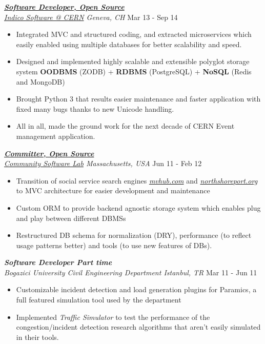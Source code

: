 \documentclass[line, margin]{res}
\begin{document}
\begin{resume}
{\sl \textbf{\href{http://indico-software.org/}{Software Developer, Open Source}} \\ \href{http://indico.cern.ch/}{Indico Software @ CERN} Geneva, CH} \hfill Mar 13 - Sep 14 \\
\vspace{-0.3cm}
\begin{itemize}
  \item Integrated MVC and structured coding, and extracted microservices which easily enabled using multiple databases for better scalability and speed.
  \item Designed and implemented highly scalable and extensible polyglot storage system \textbf{OODBMS} (ZODB) + \textbf{RDBMS} (PostgreSQL) + \textbf{NoSQL} (Redis and MongoDB)
  \item Brought Python 3 that results easier maintenance and faster application with fixed many bugs thanks to new Unicode handling.
  \item All in all, made the ground work for the next decade of CERN Event management application.
\end{itemize}

{\sl \textbf{\href{https://launchpad.net/mvhub}{Committer, Open Source}} \\ \href{http://thecsl.org/}{Community Software Lab} Massachusetts, USA} \hfill Jun 11 - Feb 12 \\
\vspace{-0.3cm}
\begin{itemize} \itemsep -2pt
  \item Transition of social service search engines \textit{\href{http://mvhub.com/}{mvhub.com}} and \textit{\href{http://northshoreport.org/}{northshoreport.org}} to MVC architecture for easier development and maintenance
  \item Custom ORM to provide backend agnostic storage system which enables plug and play between different DBMSs
  \item Restructured DB schema for normalization (DRY), performance (to reflect usage patterns better) and tools (to use new features of DBs).
\end{itemize}

{\sl \textbf{Software Developer Part time} \\ Bogazici University Civil Engineering Department Istanbul, TR} \hfill Mar 11 - Jun 11 \\
\vspace{-0.3cm}
\begin{itemize} \itemsep -2pt
  \item Customizable incident detection and load generation plugins for Paramics, a full featured simulation tool used by the department
  \item Implemented \textit{Traffic Simulator} to test the performance of the congestion/incident detection research algorithms that aren't easily simulated in their tools.
\end{itemize}


\end{resume}
\end{document}
